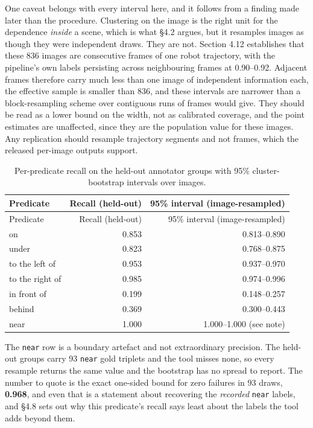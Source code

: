 One caveat belongs with every interval here, and it follows from a finding made later than the procedure. Clustering on the image is the right unit for the dependence \textit{inside} a scene, which is what \S{}4.2 argues, but it resamples images as though they were independent draws. They are not. Section 4.12 establishes that these 836 images are consecutive frames of one robot trajectory, with the pipeline's own labels persisting across neighbouring frames at 0.90--0.92. Adjacent frames therefore carry much less than one image of independent information each, the effective sample is smaller than 836, and these intervals are narrower than a block-resampling scheme over contiguous runs of frames would give. They should be read as a lower bound on the width, not as calibrated coverage, and the point estimates are unaffected, since they are the population value for these images. Any replication should resample trajectory segments and not frames, which the released per-image outputs support.

\begin{center}
\setlength{\tabcolsep}{6pt}
\small
\begin{longtable}{lrr}
\caption[Per-predicate recall on the held-out annotator groups]{Per-predicate recall on the held-out annotator groups with 95\% cluster-bootstrap intervals over images.}\\
\hline
Predicate & Recall (held-out) & 95\% interval (image-resampled) \\
\hline
\endfirsthead
\hline
Predicate & Recall (held-out) & 95\% interval (image-resampled) \\
\hline
\endhead
on & 0.853 & 0.813--0.890 \\
under & 0.823 & 0.768--0.875 \\
to the left of & 0.953 & 0.937--0.970 \\
to the right of & 0.985 & 0.974--0.996 \\
in front of & 0.199 & 0.148--0.257 \\
behind & 0.369 & 0.300--0.443 \\
near & 1.000 & 1.000--1.000 (see note) \\
\hline
\end{longtable}
\end{center}

The \texttt{near} row is a boundary artefact and not extraordinary precision. The held-out groups carry 93 \texttt{near} gold triplets and the tool misses none, so every resample returns the same value and the bootstrap has no spread to report. The number to quote is the exact one-sided bound for zero failures in 93 draws, \textbf{0.968}, and even that is a statement about recovering the \textit{recorded} \texttt{near} labels, and \S{}4.8 sets out why this predicate's recall says least about the labels the tool adds beyond them.

